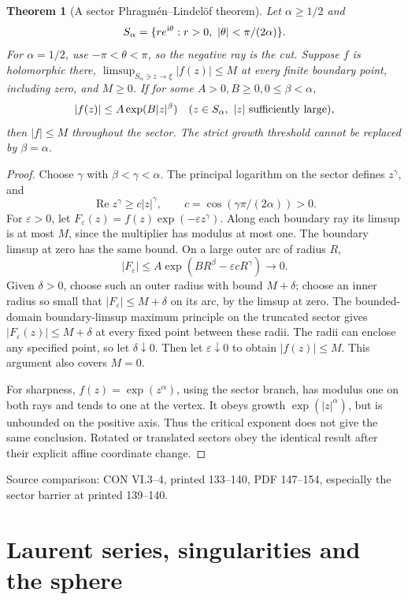 \documentclass[11pt,a4paper,openany]{book}
\newtheorem{theorem}{Theorem}[chapter]
\theoremstyle{definition}
\theoremstyle{remark}\newtheorem{remark}[theorem]{Remark}
\newcommand{\eps}{\varepsilon}\newcommand{\ee}{\varepsilon}
\DeclareMathOperator{\Ree}{Re}\DeclareMathOperator{\Imm}{Im}
\newcommand{\family}[1]{}
\newcommand{\source}[1]{\par\begingroup\small\sffamily\color{black!65}Source comparison: #1\par\endgroup}
\begin{document}
\begin{theorem}[A sector Phragm\'en--Lindel\"of theorem]\family{D12.06.06}\label{d12:06-06}
Let \(\alpha\ge1/2\) and
\[
 S_\alpha=\{re^{\iu\theta}:r>0,\ |\theta|<\pi/(2\alpha)\}.
\]
For \(\alpha=1/2\), use \(-\pi<\theta<\pi\), so the negative ray is
the cut. Suppose \(f\) is holomorphic there,
\(\limsup_{S_\alpha\ni z\to\xi}|f(z)|\le M\) at every finite
boundary point, including zero, and \(M\ge0\).
If for some \(A>0,B\ge0,0\le\beta<\alpha\),
\[
 |f(z)|\le A\exp(B|z|^\beta)
 \quad(z\in S_\alpha,\ |z|\hbox{ sufficiently large}),
\]
then \(|f|\le M\) throughout the sector.
The strict growth threshold cannot be replaced by \(\beta=\alpha\).
\end{theorem}
\begin{proof}
Choose \(\gamma\) with \(\beta<\gamma<\alpha\).
The principal logarithm on the sector defines \(z^\gamma\), and
\[
 \Ree z^\gamma\ge c|z|^\gamma,\qquad
 c=\cos(\gamma\pi/(2\alpha))>0 .
\]
For \(\eps>0\), let \(F_\eps(z)=f(z)\exp(-\eps z^\gamma)\).
Along each boundary ray its limsup is at most \(M\), since the multiplier
has modulus at most one. The boundary limsup at zero has the same bound.
On a large outer arc of radius \(R\),
\[
 |F_\eps|\le A\exp(BR^\beta-\eps cR^\gamma)\longrightarrow0.
\]
Given \(\delta>0\), choose such an outer radius with bound \(M+\delta\);
choose an inner radius so small that \(|F_\eps|\le M+\delta\)
on its arc, by the limsup at zero. The bounded-domain boundary-limsup
maximum principle on the truncated sector gives
\(|F_\eps(z)|\le M+\delta\) at every fixed point between these radii.
The radii can enclose any specified point, so let \(\delta\downarrow0\).
Then let \(\eps\downarrow0\) to obtain \(|f(z)|\le M\).
This argument also covers \(M=0\).

For sharpness, \(f(z)=\exp(z^\alpha)\), using the sector branch,
has modulus one on both rays and tends to one at the vertex.
It obeys growth \(\exp(|z|^\alpha)\), but is unbounded on the positive
axis. Thus the critical exponent does not give the same conclusion.
Rotated or translated sectors obey the identical result after their
explicit affine coordinate change.
\end{proof}
\source{CON VI.3--4, printed 133--140, PDF 147--154, especially the sector barrier at printed 139--140.}



\chapter{Laurent series, singularities and the sphere}\label{ch:d12-07}
\end{document}
